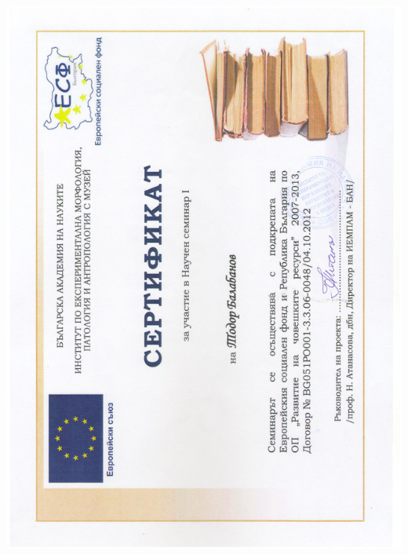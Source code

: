\documentclass[english,a4paper]{europasscv}
\begin{document}
\includegraphics[width=\textwidth,height=\textheight,keepaspectratio]{IEMPAM2013_1}
\end{document}
